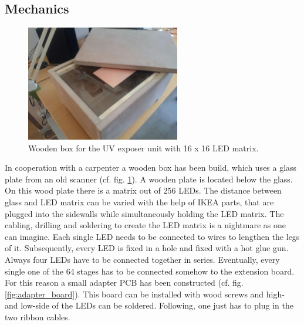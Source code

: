 \subsection{Mechanics}
\label{subsec:uv_light_mechanics}

\begin{figure}[H]                                                         
\centering          
\includegraphics[width=0.6\textwidth]{./fig/uv_lamp_box}   
\caption[Wooden box for the \gls{UV} exposer unit.]{Wooden box for the \gls{UV} exposer unit with 16 x 16 \gls{LED} matrix.}   
\label{fig:uv_lamp_box}                                                       
\end{figure} 

In cooperation with a carpenter a wooden box has been build, which uses a glass plate from an old scanner (cf. fig. \ref{fig:uv_lamp_box}). A wooden plate is located below the glass. On this wood plate there is a matrix out of 256 \glspl{LED}. The distance between glass and \gls{LED} matrix can be varied with the help of IKEA parts, that are plugged into the sidewalls while simultaneously holding the \gls{LED} matrix. The cabling, drilling and soldering to create the \gls{LED} matrix is a nightmare as one can imagine. Each single \gls{LED} needs to be connected to wires to lengthen the legs of it. Subsequently, every \gls{LED} is fixed in a hole and fixed with a hot glue gun. Always four \glspl{LED} have to be connected together in series. Eventually, every single one of the 64 stages has to be connected somehow to the extension board. For this reason a small adapter \gls{PCB} has been constructed (cf. fig. \ref{fig:adapter_board}). This board can be installed with wood screws and high- and low-side of the \glspl{LED} can be soldered. Following, one just has to plug in the two ribbon cables.   

